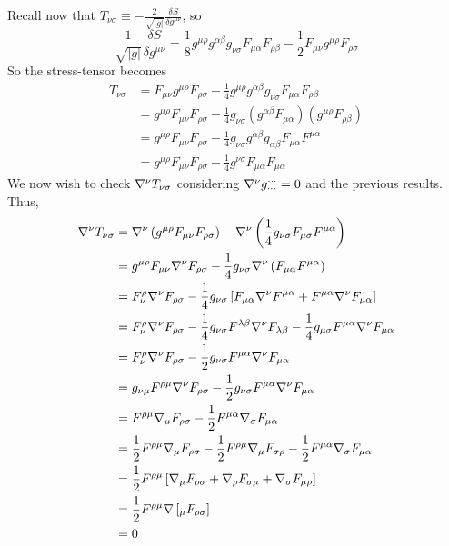 \documentclass{article}
\begin{document}
 	Recall now that $T_{\nu\sigma} \equiv - \frac{2}{\sqrt{|g|}} \frac{\delta S}{\delta g^{\mu\nu}}$, so
 	\begin{equation}
 		\frac{1}{\sqrt{|g|}} \frac{\delta S}{\delta g^{\mu\nu}} = \frac18 g^{\mu\rho} g^{\alpha\beta} g_{\nu\sigma} F_{\mu\alpha} F_{\rho\beta} - \frac12 F_{\mu\nu} g^{\mu\rho} F_{\rho\sigma}
 	\end{equation}
 	So the stress-tensor becomes 
 	\begin{align*}
 		T_{\nu\sigma} &= F_{\mu\nu} g^{\mu\rho} F_{\rho\sigma} - \frac14 g^{\mu\rho} g^{\alpha\beta} g_{\nu \sigma} F_{\mu\alpha} F_{\rho\beta} \\
 		&= g^{\mu\rho} F_{\mu\nu} F_{\rho\sigma} - \frac14 g_{\nu\sigma} \left( g^{\alpha \beta} F_{\mu\alpha} \right) \left( g^{\mu\rho} F_{\rho\beta} \right) \\
 		&= g^{\mu\rho} F_{\mu\nu} F_{\rho\sigma} - \frac14 g_{\nu\sigma} g^{\alpha \beta} g_{\alpha \beta} F_{\mu\alpha} F^{\mu\alpha} \\
 		&= g^{\mu\rho} F_{\mu\nu} F_{\rho\sigma} - \frac14 g^{\nu\sigma} F_{\mu\alpha} F_{\mu\alpha}
 	\end{align*} 
 	We now wish to check $\nabla^\nu T_{\nu\sigma}$ considering $\nabla^\nu g^{\cdots}_{\cdots} = 0$ and the previous results. Thus,
 	\begin{align*}
 		\nabla^\nu T_{\nu\sigma} &= \nabla^\nu \left( g^{\mu\rho} F_{\mu\nu} F_{\rho\sigma}\right) - \nabla^\nu \left( \frac14 g_{\nu\sigma} F_{\mu\sigma} F^{\mu\alpha} \right) \\
 		&= g^{\mu\rho} F_{\mu\nu} \nabla^{\nu} F_{\rho \sigma} - \frac14 g_{\nu\sigma} \nabla^\nu \left( F_{\mu\alpha} F^{\mu\alpha} \right) \\
 		&= F^\rho_\nu \nabla^\nu F_{\rho\sigma} -\frac14 g_{\nu\sigma} \left[ F_{\mu\alpha} \nabla^\nu F^{\mu\alpha} + F^{\mu\alpha} \nabla^\nu F_{\mu\alpha} \right] \\
 		&=F_\nu^\rho \nabla^\nu F_{\rho\sigma} - \frac14 g_{\nu\sigma} F^{\lambda\beta} \nabla^\nu F_{\lambda\beta}-\frac14 g_{\mu\sigma} F^{\mu\alpha} \nabla^\nu F_{\mu\alpha} \\
 		&= F_\nu^\rho \nabla^\nu F_{\rho\sigma} -\frac12 g_{\nu\sigma} F^{\mu\alpha} \nabla^\nu F_{\mu\alpha}\\
 		&= g_{\nu\mu} F^{\rho\mu} \nabla^\nu F_{\rho\sigma} - \frac12 g_{\nu\sigma} F^{\mu\alpha} \nabla^\nu F_{\mu\alpha} \\
 		&= F^{\rho\mu} \nabla_{\mu} F_{\rho\sigma} - \frac12 F^{\mu\alpha} \nabla_\sigma F_{\mu\alpha} \\
 		&=\frac12 F^{\rho \mu} \nabla_\mu F_{\rho\sigma} -\frac12 F^{\rho\mu} \nabla_\mu F_{\sigma \rho} - \frac12 F^{\mu\alpha} \nabla_\sigma F_{\mu\alpha} \\
 		&= \frac12 F^{\rho\mu} \left[ \nabla_\mu F_{\rho \sigma} + \nabla_\rho F_{\sigma \mu} + \nabla_\sigma F_{\mu \rho}\right] \\
 		&= \frac12 F^{\rho \mu} \nabla \left[_\mu F_{\rho\sigma} \right] \\
 		&= 0
 	\end{align*}
	\pagebreak
\end{document}
